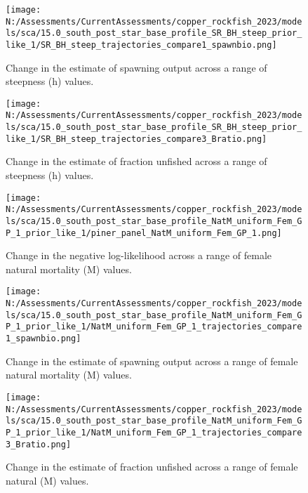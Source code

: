 \documentclass[11pt,
  english,
  letterpaper,
]{article}
\begin{document}
\pagebreak

\begin{figure}
\centering
\texttt{[image: N:/Assessments/CurrentAssessments/copper\_rockfish\_2023/models/sca/15.0\_south\_post\_star\_base\_profile\_SR\_BH\_steep\_prior\_like\_1/SR\_BH\_steep\_trajectories\_compare1\_spawnbio.png]}
\caption{Change in the estimate of spawning output across a range of steepness (h) values.\label{fig:h-ssb}}
\end{figure}

\pagebreak

\begin{figure}
\centering
\texttt{[image: N:/Assessments/CurrentAssessments/copper\_rockfish\_2023/models/sca/15.0\_south\_post\_star\_base\_profile\_SR\_BH\_steep\_prior\_like\_1/SR\_BH\_steep\_trajectories\_compare3\_Bratio.png]}
\caption{Change in the estimate of fraction unfished across a range of steepness (h) values.\label{fig:h-depl}}
\end{figure}

\pagebreak

\begin{figure}
\centering
\texttt{[image: N:/Assessments/CurrentAssessments/copper\_rockfish\_2023/models/sca/15.0\_south\_post\_star\_base\_profile\_NatM\_uniform\_Fem\_GP\_1\_prior\_like\_1/piner\_panel\_NatM\_uniform\_Fem\_GP\_1.png]}
\caption{Change in the negative log-likelihood across a range of female natural mortality (M) values.\label{fig:m-profile}}
\end{figure}

\pagebreak

\begin{figure}
\centering
\texttt{[image: N:/Assessments/CurrentAssessments/copper\_rockfish\_2023/models/sca/15.0\_south\_post\_star\_base\_profile\_NatM\_uniform\_Fem\_GP\_1\_prior\_like\_1/NatM\_uniform\_Fem\_GP\_1\_trajectories\_compare1\_spawnbio.png]}
\caption{Change in the estimate of spawning output across a range of female natural mortality (M) values.\label{fig:m-ssb}}
\end{figure}

\pagebreak

\begin{figure}
\centering
\texttt{[image: N:/Assessments/CurrentAssessments/copper\_rockfish\_2023/models/sca/15.0\_south\_post\_star\_base\_profile\_NatM\_uniform\_Fem\_GP\_1\_prior\_like\_1/NatM\_uniform\_Fem\_GP\_1\_trajectories\_compare3\_Bratio.png]}
\caption{Change in the estimate of fraction unfished across a range of female natural (M) values.\label{fig:m-depl}}
\end{figure}
\end{document}

